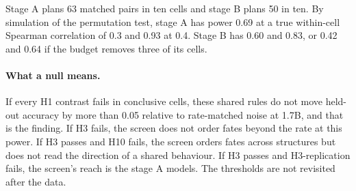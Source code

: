 Stage A plans 63 matched pairs in ten cells and stage B plans 50 in ten.
By simulation of the permutation test, stage A has power 0.69 at a true within-cell Spearman correlation of 0.3 and 0.93 at 0.4.
Stage B has 0.60 and 0.83, or 0.42 and 0.64 if the budget removes three of its cells.

\paragraph{What a null means.}
If every H1 contrast fails in conclusive cells, these shared rules do not move held-out accuracy by more than 0.05 relative to rate-matched noise at 1.7B, and that is the finding.
If H3 fails, the screen does not order fates beyond the rate at this power.
If H3 passes and H10 fails, the screen orders fates across structures but does not read the direction of a shared behaviour.
If H3 passes and H3-replication fails, the screen's reach is the stage A models.
The thresholds are not revisited after the data.
